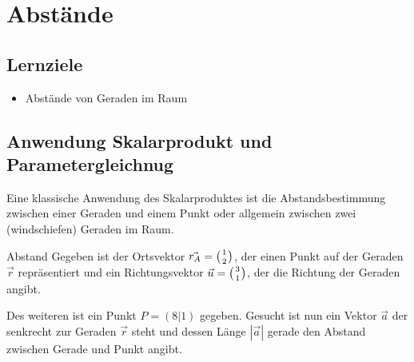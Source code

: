 \section{Abstände}

\subsection*{Lernziele}
\begin{itemize}
\item Abstände von Geraden im Raum
\end{itemize}

\subsection{Anwendung Skalarprodukt und Parametergleichnug}

Eine klassische Anwendung des Skalarproduktes ist die
Abstandsbestimmung zwischen einer Geraden und einem Punkt oder
allgemein zwischen zwei (windschiefen) Geraden im Raum.

\begin{beispiel}{Abstand}{}
Gegeben ist der Ortsvektor $\vec{r_A}=\left(1 \atop 2\right)$, der einen Punkt auf der
Geraden $\vec{r}$ repräsentiert und ein Richtungsvektor
$\vec{u}=\left(3\atop 1\right)$, der
die Richtung der Geraden angibt.

Des weiteren ist ein Punkt $P=(8|1)$ gegeben. Gesucht ist nun ein Vektor
$\vec{a}$ der senkrecht zur Geraden $\vec{r}$ steht und dessen Länge
$|\vec{a}|$ gerade den Abstand zwischen Gerade und Punkt angibt.
\end{beispiel}



